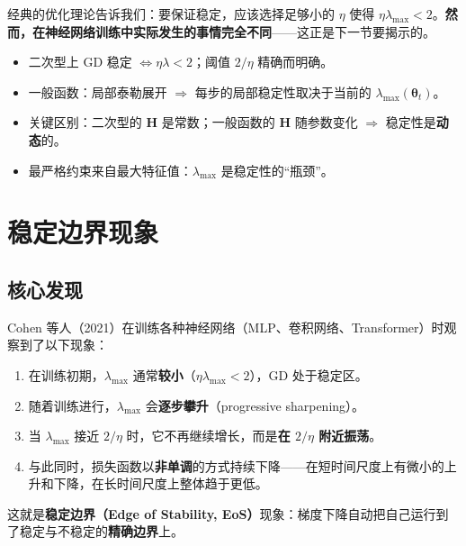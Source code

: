 \documentclass[11pt,a4paper]{ctexart}
\newcommand{\lmax}{\lambda_{\max}}
\newcommand{\Hmat}{\mathbf{H}}
\begin{document}
\begin{keybox}
经典的优化理论告诉我们：要保证稳定，应该选择足够小的 $\eta$ 使得 $\eta\lmax < 2$。\textbf{然而，在神经网络训练中实际发生的事情完全不同}——这正是下一节要揭示的。
\end{keybox}


\begin{secnote}
\begin{itemize}[leftmargin=1.5em, itemsep=2pt]
  \item 二次型上 GD 稳定 $\iff \eta\lambda < 2$；阈值 $2/\eta$ 精确而明确。
  \item 一般函数：局部泰勒展开 $\Rightarrow$ 每步的局部稳定性取决于当前的 $\lmax(\boldsymbol{\theta}_t)$。
  \item 关键区别：二次型的 $\Hmat$ 是常数；一般函数的 $\Hmat$ 随参数变化 $\Rightarrow$ 稳定性是\textbf{动态}的。
  \item 最严格约束来自最大特征值：$\lmax$ 是稳定性的``瓶颈''。
\end{itemize}
\end{secnote}

\section{稳定边界现象}\label{sec:eos}

\subsection{核心发现}

Cohen 等人（2021）在训练各种神经网络（MLP、卷积网络、Transformer）时观察到了以下现象：

\begin{enumerate}[leftmargin=2em]
  \item 在训练初期，$\lmax$ 通常\textbf{较小}（$\eta\lmax < 2$），GD 处于稳定区。
  \item 随着训练进行，$\lmax$ 会\textbf{逐步攀升}（progressive sharpening）。
  \item 当 $\lmax$ 接近 $2/\eta$ 时，它不再继续增长，而是\textbf{在 $2/\eta$ 附近振荡}。
  \item 与此同时，损失函数以\textbf{非单调}的方式持续下降——在短时间尺度上有微小的上升和下降，在长时间尺度上整体趋于更低。
\end{enumerate}

这就是\textbf{稳定边界（Edge of Stability, EoS）}现象：梯度下降自动把自己运行到了稳定与不稳定的\textbf{精确边界}上。
\end{document}
